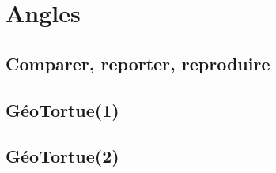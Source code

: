 \newpage

\section{Angles}

\subsection{Comparer, reporter, reproduire}

\subsection{GéoTortue(1)}

\subsection{GéoTortue(2)}
